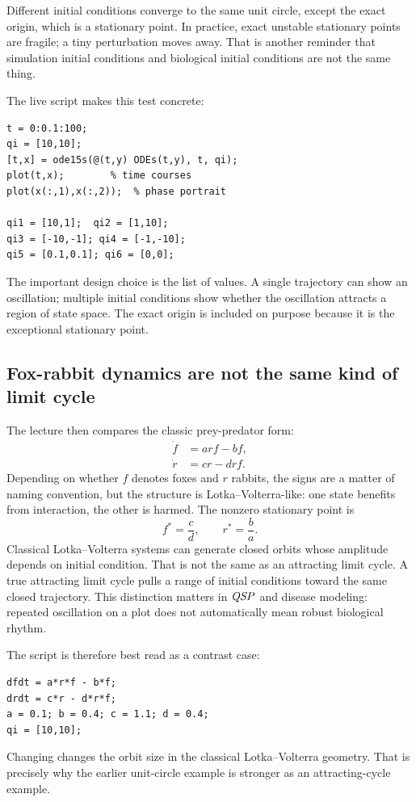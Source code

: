 \documentclass[a4paper]{article}
\newcommand{\QSP}{\ensuremath{\pksym{QSP}}}
\newcommand{\code}[1]{\texttt{\detokenize{#1}}}
\begin{document}
Different initial conditions converge to the same unit circle, except the exact origin, which is a stationary point. In practice, exact unstable stationary points are fragile; a tiny perturbation moves away. That is another reminder that simulation initial conditions and biological initial conditions are not the same thing.

The live script makes this test concrete:
\begin{verbatim}
t = 0:0.1:100;
qi = [10,10];
[t,x] = ode15s(@(t,y) ODEs(t,y), t, qi);
plot(t,x);        % time courses
plot(x(:,1),x(:,2));  % phase portrait

qi1 = [10,1];  qi2 = [1,10];
qi3 = [-10,-1]; qi4 = [-1,-10];
qi5 = [0.1,0.1]; qi6 = [0,0];
\end{verbatim}
The important design choice is the list of \code{qi} values. A single trajectory can show an oscillation; multiple initial conditions show whether the oscillation attracts a region of state space. The exact origin is included on purpose because it is the exceptional stationary point.

\subsection{Fox-rabbit dynamics are not the same kind of limit cycle}

The lecture then compares the classic prey-predator form:
\[
  \begin{aligned}
  \dot f &= arf-bf,\\
  \dot r &= cr-drf.
  \end{aligned}
\]
Depending on whether \(f\) denotes foxes and \(r\) rabbits, the signs are a matter of naming convention, but the structure is Lotka--Volterra-like: one state benefits from interaction, the other is harmed. The nonzero stationary point is
\[
  f^\ast=\frac{c}{d},\qquad r^\ast=\frac{b}{a}.
\]
Classical Lotka--Volterra systems can generate closed orbits whose amplitude depends on initial condition. That is not the same as an attracting limit cycle. A true attracting limit cycle pulls a range of initial conditions toward the same closed trajectory. This distinction matters in \QSP{} and disease modeling: repeated oscillation on a plot does not automatically mean robust biological rhythm.

The \code{fox-rabbit.mlx} script is therefore best read as a contrast case:
\begin{verbatim}
dfdt = a*r*f - b*f;
drdt = c*r - d*r*f;
a = 0.1; b = 0.4; c = 1.1; d = 0.4;
qi = [10,10];
\end{verbatim}
Changing \code{qi} changes the orbit size in the classical Lotka--Volterra geometry. That is precisely why the earlier unit-circle example is stronger as an attracting-cycle example.
\end{document}
